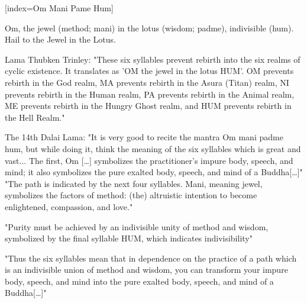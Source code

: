 [index={Om Mani Pame Hum}]
  {\small{} }
  \vspace{-2em}
  \begin{feeler}
    Om, the jewel (method; mani) in the lotus (wisdom; padme), indivisible (hum). 
    Hail to the Jewel in the Lotus.
  \end{feeler}
  \begin{explanation}
    Lama Thubken Trinley: "These six syllables prevent rebirth into the six realms of cyclic 
    existence. It translates as 'OM the jewel in the lotus HUM'. OM prevents rebirth in the God 
    realm, MA prevents rebirth in the Asura (Titan) realm, NI prevents rebirth in the Human realm, 
    PA prevents rebirth in the Animal realm, ME prevents rebirth in the Hungry Ghost realm, and 
    HUM prevents rebirth in the Hell Realm."

    The 14th Dalai Lama: "It is very good to recite the mantra Om mani padme hum, but while doing 
    it, think the meaning of the six syllables which is great and vast... The first, Om [\ldots ] 
    symbolizes the practitioner's impure body, speech, and mind; it also symbolizes the pure 
    exalted body, speech, and mind of a Buddha[\ldots ]" "The path is indicated by the next four 
    syllables. Mani, meaning jewel, symbolizes the factors of method: (the) altruistic intention 
    to become enlightened, compassion, and love." 

    "Purity must be achieved by an indivisible unity of method and wisdom, symbolized by the final 
    syllable HUM, which indicates indivisibility" 

    "Thus the six syllables mean that in dependence on the practice of a path which is an 
    indivisible union of method and wisdom, you can transform your impure body, speech, and mind 
    into the pure exalted body, speech, and mind of a Buddha[\ldots ]"
  \end{explanation}
  \vfill%
\endsong


